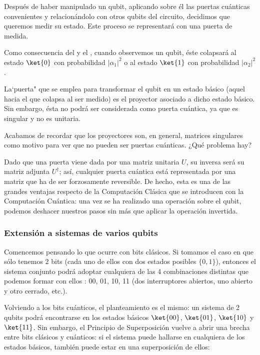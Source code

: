 \documentclass[11pt,a4paper,twoside,pdf]{article}
\numberwithin{equation}{section}
\begin{document}
			Después de haber manipulado un qubit, aplicando sobre él las puertas cuánticas convenientes y relacionándolo con otros qubits del circuito, decidimos que queremos medir su estado. Este proceso se representará con una puerta de medida. 	
				
			Como consecuencia del  y el , cuando observemos un qubit, éste colapsará al estado $\ket{0}$ con probabilidad $|\alpha_1|^2$ o al estado $\ket{1}$ con probabilidad $|\alpha_2|^2$.
			
			La`puerta" que se emplea para transformar el qubit en un estado básico (aquel hacia el que colapsa al ser medido) es el proyector asociado a dicho estado básico. Sin embargo, ésta no podrá ser considerada como puerta cuántica, ya que es singular y no es unitaria.
			
		\vspace{0.5cm}	
		\noindent Acabamos de recordar que los proyectores son, en general, matrices singulares como motivo para ver que no pueden ser puertas cuánticas. ¿Qué problema hay? 
		
		Dado que una puerta viene dada por una matriz unitaria $U$, su inversa será su matriz adjunta $U^{\dagger}$; así, cualquier puerta cuántica está representada por una matriz que ha de ser forzosamente reversible. De hecho, esta es una de las grandes ventajas respecto de la Computación Clásica que se introducen con la Computación Cuántica: una vez se ha realizado una operación sobre el qubit, podemos deshacer nuestros pasos sin más que aplicar la operación invertida.
				
		\subsubsection{Extensión a sistemas de varios qubits}
		
		Comencemos pensando lo que ocurre con bits clásicos. Si tomamos el caso en que sólo tenemos 2 bits (cada uno de ellos con dos estados posibles $\{0,1\}$), entonces el sistema conjunto podrá adoptar cualquiera de las 4 combinaciones distintas que podemos formar con ellos : 00, 01, 10, 11 (dos interruptores abiertos, uno abierto y otro cerrado, etc.).
		
		Volviendo a los bits cuánticos, el planteamiento es el mismo: un sistema de 2 qubits podrá encontrarse en los estados básicos $\ket{00}$, $\ket{01}$, $\ket{10}$ y $\ket{11}$. Sin embargo, el Principio de Superposición vuelve a abrir una brecha entre bits clásicos y cuánticos: si el sistema puede hallarse en cualquiera de los estados básicos, también puede estar en una superposición de ellos:
		
\end{document}
